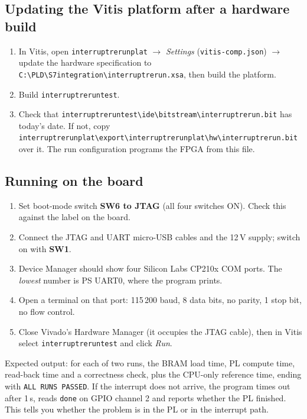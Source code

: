 \documentclass[11pt,a4paper]{article}
\newcommand{\code}[1]{\texttt{#1}}
\newcommand{\bs}{\textbackslash\allowbreak{}}
\renewcommand{\_}{\oldunderscore\allowbreak{}}
\newcommand{\pld}[1]{\code{C:\bs PLD\bs #1}}
\begin{document}
\subsection{Updating the Vitis platform after a hardware build}
\begin{enumerate}[noitemsep]
  \item In Vitis, open \code{interrupt\_rerun\_plat} $\rightarrow$ \emph{Settings} (\code{vitis-comp.json}) $\rightarrow$ update the hardware specification to \pld{S7\_integration\bs interrupt\_rerun.xsa}, then build the platform.
  \item Build \code{interrupt\_rerun\_test}.
  \item Check that \code{interrupt\_rerun\_test\bs \_ide\bs bitstream\bs interrupt\_rerun.bit} has today's date. If not, copy \code{interrupt\_rerun\_plat\bs export\bs interrupt\_rerun\_plat\bs hw\bs interrupt\_rerun.bit} over it. The run configuration programs the FPGA from this file.
\end{enumerate}

\subsection{Running on the board}\label{sec:board}
\begin{enumerate}[noitemsep]
  \item Set boot-mode switch \textbf{SW6 to JTAG} (all four switches ON). Check this against the label on the board.
  \item Connect the JTAG and UART micro-USB cables and the 12\,V supply; switch on with \textbf{SW1}.
  \item Device Manager should show four Silicon Labs CP210x COM ports. The \emph{lowest} number is PS UART0, where the program prints.
  \item Open a terminal on that port: 115\,200 baud, 8 data bits, no parity, 1 stop bit, no flow control.
  \item Close Vivado's Hardware Manager (it occupies the JTAG cable), then in Vitis select \code{interrupt\_rerun\_test} and click \emph{Run}.
\end{enumerate}
Expected output: for each of two runs, the BRAM load time, PL compute time, read-back time and a correctness check, plus the CPU-only reference time, ending with \code{ALL RUNS PASSED}. If the interrupt does not arrive, the program times out after 1\,s, reads \code{done} on GPIO channel 2 and reports whether the PL finished. This tells you whether the problem is in the PL or in the interrupt path.
\end{document}
